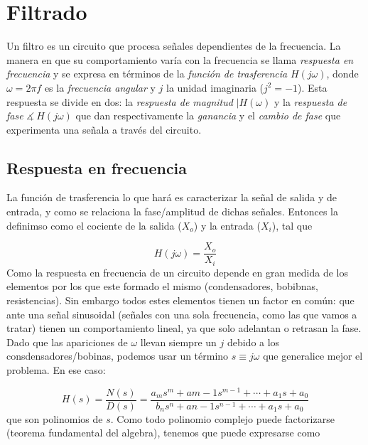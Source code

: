 \documentclass[11pt]{article} %
\begin{document}
\newpage

\section{Filtrado}

Un filtro es un circuito que procesa señales dependientes de la frecuencia. La manera en que su comportamiento varía con la frecuencia se llama \textit{respuesta en frecuencia} y se expresa en términos de la \textit{función de trasferencia} $H(j\omega)$, donde $\omega = 2 \pi f$ es la \textit{frecuencia angular} y $j$ la unidad imaginaria ($j^2 = -1$). Esta respuesta se divide en dos: la \textit{respuesta de magnitud} $|H(\omega)$ y la \textit{respuesta de fase} $\measuredangle \ H(j \omega)$ que dan respectivamente la \textit{ganancia} y el \textit{cambio de fase} que experimenta una señala a través del circuito.

\subsection{Respuesta en frecuencia}

La función de trasferencia lo que hará es caracterizar la señal de salida y de entrada, y como se relaciona la fase/amplitud de dichas señales. Entonces la definimso como el cociente de la salida ($X_o$) y la entrada ($X_i$), tal que

\begin{equation}
H(j \omega) = \dfrac{X_o}{X_i}
\end{equation}
Como la respuesta en frecuencia de un circuito depende en gran medida de los elementos por los que este formado el mismo (condensadores,  bobibnas, resistencias). Sin embargo todos estes elementos tienen un factor en común: que ante una señal sinusoidal (señales con una sola frecuencia, como las que vamos a tratar) tienen un comportamiento lineal, ya que solo adelantan o retrasan la fase. Dado que las apariciones de $\omega$ llevan siempre un $j$ debido a los consdensadores/bobinas, podemos usar un término $s \equiv j \omega$ que generalice mejor el problema. En ese caso:

\begin{equation}
H(s) = \dfrac{N(s)}{D(s)} = \dfrac{a_m s^m + a{m-1} s^{m-1} + \cdots + a_1 s + a_0}{b_n s^n + a{n-1} s^{n-1} + \cdots + a_1 s + a_0}
\end{equation}
que son polinomios de $s$. Como todo polinomio complejo puede factorizarse (teorema fundamental del algebra), tenemos que puede expresarse como
\end{document}
